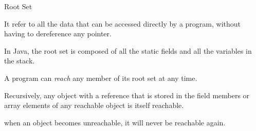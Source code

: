 \begin{bibunit}[apalike]
\tableofcontentslide[sections={2-6},sectionstyle={show/shaded},subsectionstyle={show/shaded/hide},subsubsectionstyle={hide/hide/hide/hide}]

\begin{frame}{Root Set}
	\begin{definition}
		It refer to all the data that can be accessed directly by a program, without having to dereference any pointer.
	\end{definition}
	\vfill
	\begin{example}
		In Java, the root set is composed of all the static fields and all the variables in the stack.
	\end{example}
	\vfill
	\begin{description}
	\item A program can \emph{reach} any member of its root set at any time.
	\item Recursively, any object with a reference that is stored in the field members or array elements of any reachable object is itself reachable.
	\item[Note] when an object becomes unreachable, it will never be reachable again.
	\end{description}
\end{frame}


\end{bibunit}
